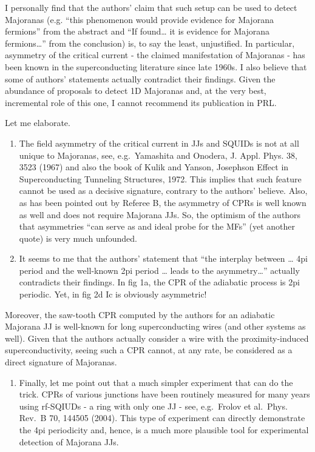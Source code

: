 \documentclass[11pt]{article}
\providecommand{\tightlist}{%
      \setlength{\itemsep}{0pt}\setlength{\parskip}{0pt}}
\begin{document}
I personally find that the authors' claim that such setup can be used to
detect Majoranas (e.g. ``this phenomenon would provide evidence for
Majorana fermions'' from the abstract and ``If found\ldots{} it is
evidence for Majorana fermions\ldots{}'' from the conclusion) is, to say
the least, unjustified. In particular, asymmetry of the critical current
- the claimed manifestation of Majoranas - has been known in the
superconducting literature since late 1960s. I also believe that some of
authors' statements actually contradict their findings. Given the
abundance of proposals to detect 1D Majoranas and, at the very best,
incremental role of this one, I cannot recommend its publication in PRL.

Let me elaborate.

\begin{enumerate}
\def\labelenumi{\arabic{enumi})}
\item
  The field asymmetry of the critical current in JJs and SQUIDs is not
  at all unique to Majoranas, see, e.g.~Yamashita and Onodera, J. Appl.
  Phys. 38, 3523 (1967) and also the book of Kulik and Yanson, Josephson
  Effect in Superconducting Tunneling Structures, 1972. This implies
  that such feature cannot be used as a decisive signature, contrary to
  the authors' believe. Also, as has been pointed out by Referee B, the
  asymmetry of CPRs is well known as well and does not require Majorana
  JJs. So, the optimism of the authors that asymmetries ``can serve as
  and ideal probe for the MFs'' (yet another quote) is very much
  unfounded.
\item
  It seems to me that the authors' statement that ``the interplay
  between \ldots{} 4pi period and the well-known 2pi period \ldots{}
  leads to the asymmetry\ldots{}'' actually contradicts their findings.
  In fig 1a, the CPR of the adiabatic process is 2pi periodic. Yet, in
  fig 2d Ic is obviously asymmetric!
\end{enumerate}

Moreover, the saw-tooth CPR computed by the authors for an adiabatic
Majorana JJ is well-known for long superconducting wires (and other
systems as well). Given that the authors actually consider a wire with
the proximity-induced superconductivity, seeing such a CPR cannot, at
any rate, be considered as a direct signature of Majoranas.

\begin{enumerate}
\def\labelenumi{\arabic{enumi})}
\setcounter{enumi}{2}
\tightlist
\item
  Finally, let me point out that a much simpler experiment that can do
  the trick. CPRs of various junctions have been routinely measured for
  many years using rf-SQIUDs - a ring with only one JJ - see,
  e.g.~Frolov et al.~Phys. Rev.~B 70, 144505 (2004). This type of
  experiment can directly demonstrate the 4pi periodicity and, hence, is
  a much more plausible tool for experimental detection of Majorana JJs.
\end{enumerate}
\end{document}

